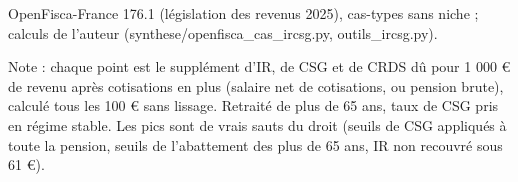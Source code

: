 OpenFisca-France 176.1 (législation des revenus 2025), cas-types sans niche ; calculs de l'auteur (synthese/openfisca\_cas\_ircsg.py, outils\_ircsg.py).\par Note : chaque point est le supplément d'IR, de CSG et de CRDS dû pour 1 000 \euro{} de revenu après cotisations en plus (salaire net de cotisations, ou pension brute), calculé tous les 100 \euro{} sans lissage. Retraité de plus de 65 ans, taux de CSG pris en régime stable. Les pics sont de vrais sauts du droit (seuils de CSG appliqués à toute la pension, seuils de l'abattement des plus de 65 ans, IR non recouvré sous 61 \euro{}).
